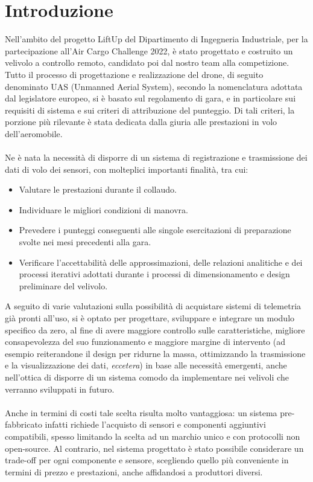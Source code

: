 \documentclass[12pt]{article}
\begin{document}
\section*{Introduzione}
Nell'ambito del progetto LiftUp del Dipartimento di Ingegneria Industriale, per la partecipazione all'Air Cargo Challenge 2022, è stato progettato e costruito un velivolo a controllo remoto, candidato poi dal nostro team alla competizione.
Tutto il processo di progettazione e realizzazione del drone, di seguito denominato UAS (Unmanned Aerial System), secondo la nomenclatura adottata dal legislatore europeo, si è basato sul regolamento di gara, e in particolare sui requisiti di sistema e sui criteri di attribuzione del punteggio. Di tali criteri, la porzione più rilevante è stata dedicata dalla giuria alle prestazioni in volo dell'aeromobile. 
\\\\
Ne è nata la necessità di disporre di un sistema di registrazione e trasmissione dei dati di volo dei sensori, con molteplici importanti finalità, tra cui: 

\begin{itemize}
\item Valutare le prestazioni durante il collaudo.
\item Individuare le migliori condizioni di manovra.
\item Prevedere i punteggi conseguenti alle singole esercitazioni di preparazione svolte nei mesi precedenti alla gara.
\item Verificare l'accettabilità delle approssimazioni, delle relazioni analitiche e dei processi iterativi adottati durante i processi di dimensionamento e design preliminare del velivolo.
\end{itemize}

\noindent
A seguito di varie valutazioni sulla possibilità di acquistare sistemi di telemetria già pronti all'uso, si è optato per progettare, sviluppare e integrare un modulo specifico da zero, al fine di avere maggiore controllo sulle caratteristiche, migliore consapevolezza del suo funzionamento e maggiore margine di intervento (ad esempio reiterandone il design per ridurne la massa, ottimizzando la trasmissione e la visualizzazione dei dati, \textit{eccetera}) in base alle necessità emergenti, anche nell'ottica di disporre di un sistema comodo da implementare nei velivoli che verranno sviluppati in futuro.
\\\\
Anche in termini di costi tale scelta risulta molto vantaggiosa: un sistema pre-fabbricato infatti richiede l'acquisto di sensori e componenti aggiuntivi compatibili, spesso limitando la scelta ad un marchio unico e con protocolli non open-source. Al contrario, nel sistema progettato è stato possibile considerare un trade-off per ogni componente e sensore, scegliendo quello più conveniente in termini di prezzo e prestazioni, anche affidandosi a produttori diversi. 
\end{document}
